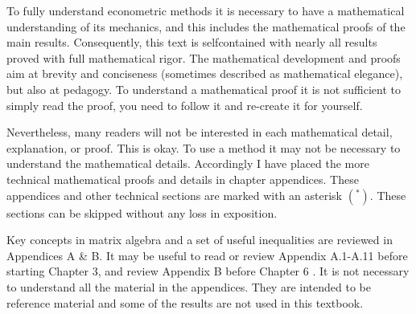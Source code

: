 \documentclass[10pt]{article}
\begin{document}
To fully understand econometric methods it is necessary to have a mathematical understanding of its mechanics, and this includes the mathematical proofs of the main results. Consequently, this text is selfcontained with nearly all results proved with full mathematical rigor. The mathematical development and proofs aim at brevity and conciseness (sometimes described as mathematical elegance), but also at pedagogy. To understand a mathematical proof it is not sufficient to simply read the proof, you need to follow it and re-create it for yourself.

Nevertheless, many readers will not be interested in each mathematical detail, explanation, or proof. This is okay. To use a method it may not be necessary to understand the mathematical details. Accordingly I have placed the more technical mathematical proofs and details in chapter appendices. These appendices and other technical sections are marked with an asterisk $\left(^{*}\right)$. These sections can be skipped without any loss in exposition.

Key concepts in matrix algebra and a set of useful inequalities are reviewed in Appendices A \& B. It may be useful to read or review Appendix A.1-A.11 before starting Chapter 3, and review Appendix B before Chapter 6 . It is not necessary to understand all the material in the appendices. They are intended to be reference material and some of the results are not used in this textbook.
\end{document}

